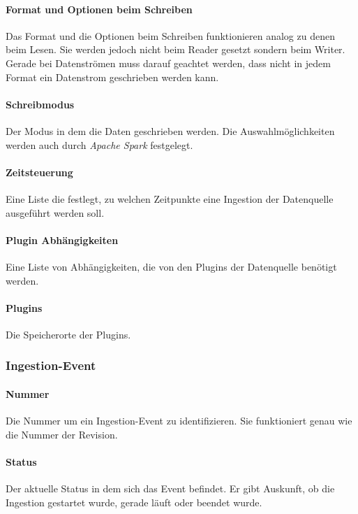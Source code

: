 \paragraph{Format und Optionen beim Schreiben}
Das Format und die Optionen beim Schreiben funktionieren analog zu denen beim Lesen.
Sie werden jedoch nicht beim Reader gesetzt sondern beim Writer.
Gerade bei Datenströmen muss darauf geachtet werden, dass nicht in jedem Format ein Datenstrom geschrieben werden kann.

\paragraph{Schreibmodus} 
Der Modus in dem die Daten geschrieben werden.
Die Auswahlmöglichkeiten werden auch durch \textit{Apache Spark} festgelegt.

\paragraph{Zeitsteuerung} 
Eine Liste die festlegt, zu welchen Zeitpunkte eine Ingestion der Datenquelle ausgeführt werden soll.

\paragraph{Plugin Abhängigkeiten} 
Eine Liste von Abhängigkeiten, die von den Plugins der Datenquelle benötigt werden.

\paragraph{Plugins} 
Die Speicherorte der Plugins. 
    
\subsubsection*{Ingestion-Event}

\paragraph{Nummer}
Die Nummer um ein Ingestion-Event zu identifizieren.
Sie funktioniert genau wie die Nummer der Revision. 

\paragraph{Status}
Der aktuelle Status in dem sich das Event befindet.
Er gibt Auskunft, ob die Ingestion gestartet wurde, gerade läuft oder beendet wurde. 

